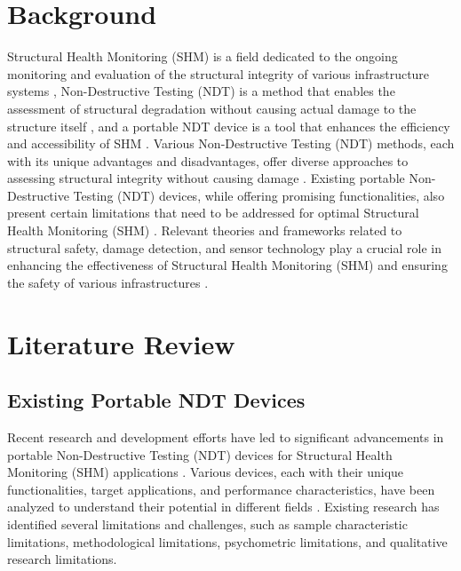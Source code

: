 \documentclass[journal, a4paper]{IEEEtran}
\begin{document}
\section{Background}
Structural Health Monitoring (SHM) is a field dedicated to the ongoing monitoring and evaluation of the structural integrity
of various infrastructure systems \cite{Katam2023}, Non-Destructive Testing (NDT) is a method that enables the assessment
of structural degradation without causing actual damage to the structure itself \cite{Katam2023},
and a portable NDT device is a tool that enhances the efficiency and accessibility of SHM \cite{Hassani2023} \cite{Katam2023}.
Various Non-Destructive Testing (NDT) methods, each with its unique advantages and disadvantages,
offer diverse approaches to assessing structural integrity without causing damage \cite{Dolati2021} \cite{Verma2013}.
Existing portable Non-Destructive Testing (NDT) devices, while offering promising functionalities,
also present certain limitations that need to be addressed for optimal Structural Health Monitoring (SHM) \cite{Hassani2023} \cite{Zhu2011}.
Relevant theories and frameworks related to structural safety, damage detection,
and sensor technology play a crucial role in enhancing the effectiveness of Structural Health Monitoring (SHM)
and ensuring the safety of various infrastructures \cite{Chen2021} \cite{Gharehbaghi2022}.


\section{Literature Review}

\subsection{Existing Portable NDT Devices}
Recent research and development efforts have led to significant advancements in portable Non-Destructive Testing (NDT) devices
for Structural Health Monitoring (SHM) applications \cite{Vijayan2023} \cite{Parsy2018} \cite{Hassani2023}.
Various devices, each with their unique functionalities, target applications, and performance characteristics,
have been analyzed to understand their potential in different fields \cite{Khanna2020} \cite{Baig2021} \cite{Corzo2020}.
Existing research has identified several limitations and challenges, such as sample characteristic limitations,
methodological limitations, psychometric limitations, and qualitative research limitations.
\end{document}
